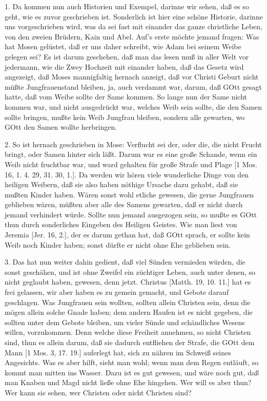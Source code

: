 1. Da kommen nun auch Historien und Exempel, darinne wir sehen, daß es so geht, wie es zuvor geschrieben ist. Sonderlich ist hier eine schöne Historie, darinne uns vorgeschrieben wird, was da sei fast mit einander das ganze christliche Leben, von den zweien Brüdern, Kain und Abel. Auf’s erste möchte jemand fragen: Was hat Mosen gelüstet, daß er uns daher schreibt, wie Adam bei seinem Weibe gelegen sei? Es ist darum geschehen, daß man das lesen muß in
aller Welt vor jedermann, wie die Zwey Hochzeit mit einander haben, daß das Gesetz wird angezeigt, daß Moses mannigfaltig hernach anzeigt, daß vor Christi Geburt nicht müßte Jungfrauenstand bleiben, ja, auch verdammt war, darum, daß GOtt gesagt hatte, daß vom Weibe sollte der Same kommen. So lange nun der Same nicht kommen war, und nicht ausgedrückt war, welches Weib sein sollte, die den Samen sollte bringen, mußte kein Weib Jungfrau bleiben, sondern alle gewarten, wo GOtt den Samen wollte herbringen.

2. So ist hernach geschrieben in Mose: Verflucht sei der, oder die, die nicht Frucht bringt, oder Samen hinter sich läßt. Darum war es eine große Schande, wenn ein Weib nicht fruchtbar war, und ward gehalten für große Strafe und Plage [1 Mos. 16, 1. 4. 29, 31. 30, 1.]. Da werden wir hören viele wunderliche Dinge von den heiligen Weibern, daß sie also haben nöthige Ursache dazu gehabt, daß sie mußten Kinder haben. Wären sonst wohl etliche gewesen, die gerne Jungfrauen geblieben wären, müßten aber alle des Samens gewarten, daß er nicht durch jemand verhindert würde. Sollte nun jemand ausgezogen sein, so mußte es GOtt thun durch sonderliches Eingeben des Heiligen Geistes. Wie man liest von Jeremia [Jer. 16, 2.], der es darum gethan hat, daß GOtt sprach, er sollte kein Weib noch Kinder haben; sonst dürfte er nicht ohne Ehe geblieben sein.

3. Das hat nun weiter dahin gedient, daß viel Sünden vermieden würden, die sonst geschähen, und ist ohne Zweifel ein züchtiger Leben, auch unter denen, so nicht geglaubt haben, gewesen, denn jetzt. Christus [Matth. 19, 10. 11.] hat es frei gelassen, wir aber haben es zu gemein gemacht, und Gebote darauf geschlagen. Was Jungfrauen sein wollten, sollten allein Christen sein, denn die mögen allein solche Gnade haben; dem andern Haufen ist es nicht gegeben, die sollten unter dem Gebote bleiben, um vieler Sünde und schändliches Wesens willen, vorzukommen. Denn welche diese Freiheit annehmen, so nicht Christen sind, thun es allein darum, daß sie dadurch entfliehen der Strafe, die GOtt dem Mann [1 Mos. 3, 17. 19.] auferlegt hat, sich zu nähren im Schweiß seines Angesichts. Was es aber hilft, sieht man wohl; wenn man dem Regen entläuft, so kommt man mitten ins Wasser. Dazu ist es gut gewesen, und wäre noch gut, daß man Knaben und Magd nicht ließe ohne Ehe hingehen. Wer will es aber thun? Wer kann sie sehen, wer Christen oder nicht Christen sind?

